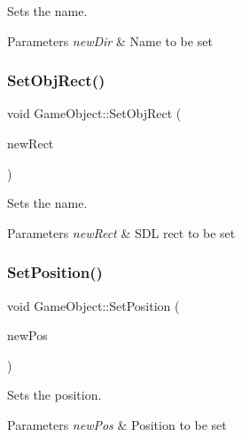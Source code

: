 Sets the name. 


\begin{DoxyParams}{Parameters}
{\em new\+Dir} & Name to be set \\
\hline
\end{DoxyParams}
\mbox{\label{class_game_object_a898813cdba2aa0888f6e5b0e4fc6ac64}} 
\subsubsection{\texorpdfstring{Set\+Obj\+Rect()}{SetObjRect()}}
{\footnotesize\ttfamily void Game\+Object\+::\+Set\+Obj\+Rect (\begin{DoxyParamCaption}\item[{S\+D\+L\+\_\+\+Rect}]{new\+Rect }\end{DoxyParamCaption})\hspace{0.3cm}{\ttfamily [inline]}}



Sets the name. 


\begin{DoxyParams}{Parameters}
{\em new\+Rect} & S\+DL rect to be set \\
\hline
\end{DoxyParams}
\mbox{\label{class_game_object_a0c213e4df823a0f68cf8906a6937f88e}} 
\subsubsection{\texorpdfstring{Set\+Position()}{SetPosition()}}
{\footnotesize\ttfamily void Game\+Object\+::\+Set\+Position (\begin{DoxyParamCaption}\item[{\mbox{\hyperlink{struct_vector2_d}{Vector2D}}}]{new\+Pos }\end{DoxyParamCaption})\hspace{0.3cm}{\ttfamily [inline]}}



Sets the position. 


\begin{DoxyParams}{Parameters}
{\em new\+Pos} & Position to be set \\
\hline
\end{DoxyParams}
\mbox{\label{class_game_object_a67cd10342fab71294976bf7fd5e22e01}} 
